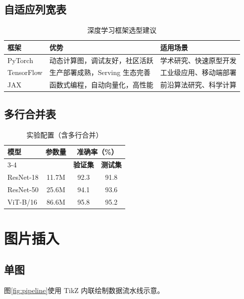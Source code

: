 \documentclass{harryopo-report}
\begin{document}
\section{自适应列宽表}

\begin{table}[htbp]
\centering
\begin{tabularx}{\textwidth}{lXX}
\toprule
\textbf{框架} & \textbf{优势} & \textbf{适用场景} \\
\midrule
PyTorch    & 动态计算图，调试友好，社区活跃 & 学术研究、快速原型开发 \\
TensorFlow & 生产部署成熟，Serving 生态完善 & 工业级应用、移动端部署 \\
JAX        & 函数式编程，自动向量化，高性能 & 前沿算法研究、科学计算 \\
\bottomrule
\end{tabularx}
\caption{深度学习框架选型建议}
\label{tab:framework}
\end{table}

\section{多行合并表}

\begin{table}[htbp]
\centering
\begin{tabular}{lccc}
\toprule
\multirow{2}{*}{\textbf{模型}} & \multirow{2}{*}{\textbf{参数量}} & \multicolumn{2}{c}{\textbf{准确率（\%）}} \\
\cmidrule(lr){3-4}
   &  & \textbf{验证集} & \textbf{测试集} \\
\midrule
ResNet-18  & 11.7M & 92.3 & 91.8 \\
ResNet-50  & 25.6M & 94.1 & 93.6 \\
ViT-B/16   & 86.6M & 95.8 & 95.2 \\
\bottomrule
\end{tabular}
\caption{实验配置（含多行合并）}
\label{tab:config}
\end{table}

\chapter{图片插入}

\section{单图}

图\ref{fig:pipeline}使用 TikZ 内联绘制数据流水线示意。
\end{document}
